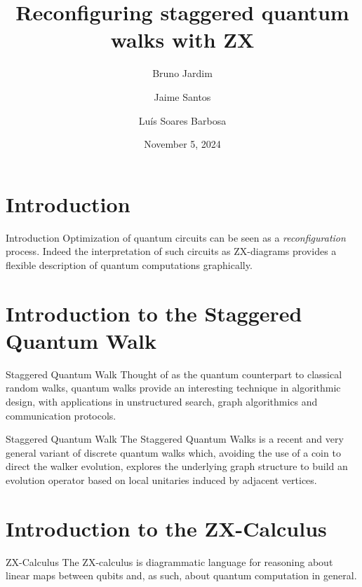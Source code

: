 \documentclass{beamer}
\title{Reconfiguring staggered quantum walks with ZX}
\date{November 5, 2024}
\author{Bruno Jardim \and Jaime Santos \and Luís Soares Barbosa}
\institute{HASLab - INESCTEC}
\begin{document}
\maketitle

\section{Introduction}
\begin{frame}{Introduction}
Optimization of quantum circuits can be seen as a \emph{reconfiguration} process. Indeed the interpretation of such circuits as ZX-diagrams provides a flexible description of quantum computations graphically.
\end{frame}

\section{Introduction to the Staggered Quantum Walk}
\begin{frame}{Staggered Quantum Walk}
	Thought of as the quantum counterpart to classical random walks, quantum walks provide an interesting technique in algorithmic design, with  applications in unstructured search, graph algorithmics and communication protocols.
\end{frame}
\begin{frame}{Staggered Quantum Walk}
	The Staggered Quantum Walks is a recent and very general variant of discrete quantum walks which, avoiding the use of a coin to direct the walker evolution, explores the underlying graph structure to build an evolution operator based on local unitaries induced by adjacent vertices.
\end{frame}

\section{Introduction to the ZX-Calculus}
\begin{frame}{ZX-Calculus}
	The ZX-calculus is diagrammatic language for reasoning about linear maps between qubits and, as such, about quantum computation in general.


\end{frame}
\end{document}
